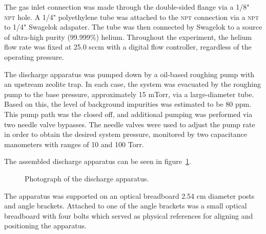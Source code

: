 The gas inlet connection was made through the double-sided flange via a 1/8"
\textsc{npt} hole. A 1/4" polyethylene tube was attached to the \textsc{npt}
connection via a \textsc{npt} to 1/4" Swagelok adapater. The tube was then
connected by Swagelok to a source of ultra-high purity (99.999\%) helium.
Throughout the experiment, the helium flow rate was fixed at 25.0 sccm with a
digital flow controller, regardless of the operating pressure.

The discharge apparatus was pumped down by a oil-based roughing pump with an
upstream zeolite trap. In each case, the system was evacuated by the roughing
pump to the base pressure, approximately 15 mTorr, via a large-diameter tube.
Based on this, the level of background impurities was estimated to be 80 ppm.
This pump path was the closed off, and additional pumping was performed via two
needle valve bypasses. The needle valves were used to adjust the pump rate in
order to obtain the desired system pressure, monitored by two capacitance
manometers with ranges of 10 and 100 Torr.

The assembled discharge apparatus can be seen in figure~\ref{fig:appphoto}.
\begin{figure}
  \centering
  \setlength\fboxsep{0pt}
  \setlength\fboxrule{1.0pt}
  \caption{Photograph of the discharge apparatus.}
  \label{fig:appphoto}
\end{figure}
The apparatus was supported on an optical breadboard 2.54 cm diameter posts and
angle brackets. Attached to one of the angle brackets was a small optical
breadboard with four bolts which served as physical references for aligning and
positioning the apparatus.

